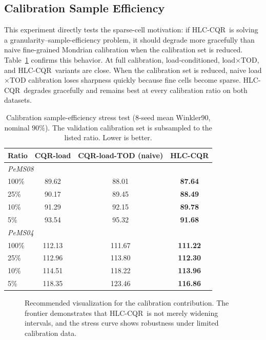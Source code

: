 \documentclass[letterpaper,journal]{IEEEtran}
\newcommand{\hlc}{HLC-CQR}
\begin{document}
\subsection{Calibration Sample Efficiency}
This experiment directly tests the sparse-cell motivation: if \hlc\ is solving a granularity--sample-efficiency problem, it should degrade more gracefully than naive fine-grained Mondrian calibration when the calibration set is reduced. Table~\ref{tab:hlc_sample} confirms this behavior. At full calibration, load-conditioned, load$\times$TOD, and \hlc\ variants are close. When the calibration set is reduced, naive load$\times$TOD calibration loses sharpness quickly because fine cells become sparse. \hlc\ degrades gracefully and remains best at every calibration ratio on both datasets.

\begin{table}[t]
\centering
\caption{Calibration sample-efficiency stress test (8-seed mean Winkler90, nominal $90\%$). The validation calibration set is subsampled to the listed ratio. Lower is better.}
\label{tab:hlc_sample}
\footnotesize
\begin{tabular}{lccc}
\toprule
Ratio & CQR-load & CQR-load-TOD (naive) & \hlc \\
\midrule
\multicolumn{4}{l}{\emph{PeMS08}} \\
100\% & 89.62 & 88.01 & \textbf{87.64} \\
 25\% & 90.17 & 89.45 & \textbf{88.49} \\
 10\% & 91.29 & 92.15 & \textbf{89.78} \\
  5\% & 93.54 & 95.32 & \textbf{91.68} \\
\midrule
\multicolumn{4}{l}{\emph{PeMS04}} \\
100\% & 112.13 & 111.67 & \textbf{111.22} \\
 25\% & 112.96 & 113.80 & \textbf{112.30} \\
 10\% & 114.51 & 118.22 & \textbf{113.96} \\
  5\% & 118.35 & 123.46 & \textbf{116.86} \\
\bottomrule
\end{tabular}
\end{table}

\begin{figure}[t]
\centering
{}
\caption{Recommended visualization for the calibration contribution. The frontier demonstrates that \hlc\ is not merely widening intervals, and the stress curve shows robustness under limited calibration data.}
\label{fig:frontier_sample}
\end{figure}
\end{document}
